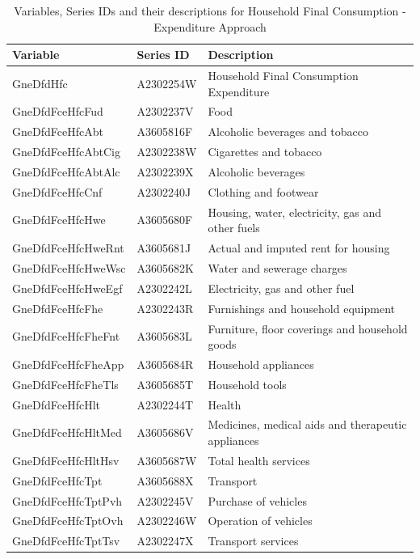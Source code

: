 \documentclass[a4paper, 11pt]{article}
\begin{document}
\begin{table}
	\caption{Variables, Series IDs and their descriptions for Household Final Consumption - Expenditure Approach}
	\small
	\centering
	\begin{tabular*}{\columnwidth}[width = \textwidth]{lll}
		\toprule
		\textbf{Variable} & \textbf{Series ID} & \textbf{Description}\\
		\midrule
		GneDfdHfc          & A2302254W & Household Final Consumption Expenditure\\
		GneDfdFceHfcFud    & A2302237V & Food\\
		GneDfdFceHfcAbt    & A3605816F & Alcoholic beverages and tobacco\\
		GneDfdFceHfcAbtCig & A2302238W & Cigarettes and tobacco\\
		GneDfdFceHfcAbtAlc & A2302239X & Alcoholic beverages\\
		\addlinespace
		GneDfdFceHfcCnf    & A2302240J & Clothing and footwear\\
		GneDfdFceHfcHwe    & A3605680F & Housing, water, electricity, gas and other fuels\\
		GneDfdFceHfcHweRnt & A3605681J & Actual and imputed rent for housing\\
		GneDfdFceHfcHweWsc & A3605682K & Water and sewerage charges\\
		GneDfdFceHfcHweEgf & A2302242L & Electricity, gas and other fuel\\
		\addlinespace
		GneDfdFceHfcFhe    & A2302243R & Furnishings and household equipment\\
		GneDfdFceHfcFheFnt & A3605683L & Furniture, floor coverings and household goods\\
		GneDfdFceHfcFheApp & A3605684R & Household appliances\\
		GneDfdFceHfcFheTls & A3605685T & Household tools\\
		GneDfdFceHfcHlt    & A2302244T & Health\\
		\addlinespace
		GneDfdFceHfcHltMed & A3605686V & Medicines, medical aids and therapeutic appliances\\
		GneDfdFceHfcHltHsv & A3605687W & Total health services\\
		GneDfdFceHfcTpt    & A3605688X & Transport\\
		GneDfdFceHfcTptPvh & A2302245V & Purchase of vehicles\\
		GneDfdFceHfcTptOvh & A2302246W & Operation of vehicles\\
		\addlinespace
		GneDfdFceHfcTptTsv & A2302247X & Transport services\\

\end{tabular*}
\end{table}
\end{document}
